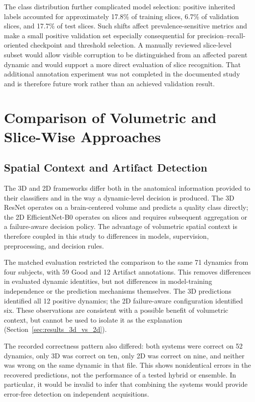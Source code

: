 The class distribution further complicated model selection: positive inherited labels accounted for approximately 17.8\% of training slices, 6.7\% of validation slices, and 17.7\% of test slices. Such shifts affect prevalence-sensitive metrics and make a small positive validation set especially consequential for precision--recall-oriented checkpoint and threshold selection. A manually reviewed slice-level subset would allow visible corruption to be distinguished from an affected parent dynamic and would support a more direct evaluation of slice recognition. That additional annotation experiment was not completed in the documented study and is therefore future work rather than an achieved validation result.

\section{Comparison of Volumetric and Slice-Wise Approaches}
\label{sec:discussion_3d_2d_comparison}

\subsection{Spatial Context and Artifact Detection}
\label{subsec:discussion_comparison_context}

The 3D and 2D frameworks differ both in the anatomical information provided to their classifiers and in the way a dynamic-level decision is produced. The 3D ResNet operates on a brain-centered volume and predicts a quality class directly; the 2D EfficientNet-B0 operates on slices and requires subsequent aggregation or a failure-aware decision policy. The advantage of volumetric spatial context is therefore coupled in this study to differences in models, supervision, preprocessing, and decision rules.

The matched evaluation restricted the comparison to the same 71 dynamics from four subjects, with 59 Good and 12 Artifact annotations. This removes differences in evaluated dynamic identities, but not differences in model-training independence or the prediction mechanisms themselves. The 3D predictions identified all 12 positive dynamics; the 2D failure-aware configuration identified six. These observations are consistent with a possible benefit of volumetric context, but cannot be used to isolate it as the explanation (Section~\ref{sec:results_3d_vs_2d}).

The recorded correctness pattern also differed: both systems were correct on 52 dynamics, only 3D was correct on ten, only 2D was correct on nine, and neither was wrong on the same dynamic in that file. This shows nonidentical errors in the recovered predictions, not the performance of a tested hybrid or ensemble. In particular, it would be invalid to infer that combining the systems would provide error-free detection on independent acquisitions.

